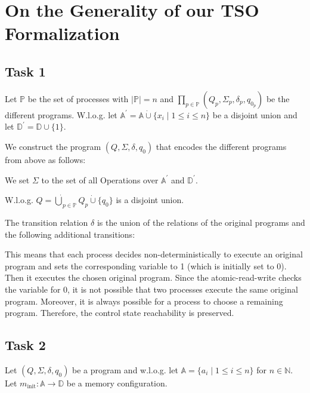 \section{On the Generality of our TSO Formalization}

\subsection{Task 1}
Let $\mathds{P}$ be the set of processes with $|\mathds{P}| = n$ and $\prod_{p \in \mathds{P}} (Q_p,\Sigma_p,\delta_p,q_{0_p})$ be the different programs. W.l.o.g. let $\mathds{A}^\prime = \mathds{A} \dot\cup \{x_i \mid 1 \leq i \leq n\}$ be a disjoint union and let $\mathds{D}^\prime = \mathds{D} \cup \{1\}$.

We construct the program $(Q,\Sigma,\delta,q_0)$ that encodes the different programs from above as follows:

We set $\Sigma$ to the set of all Operations over $\mathds{A}^\prime$ and $\mathds{D}^\prime$.

W.l.o.g. $Q = \dot\bigcup_{p \in \mathds{P}} Q_p \dot\cup \{q_0\}$ is a disjoint union.

The transition relation $\delta$ is the union of the relations of the original programs and the following additional transitions:
\begin{figure}[h]
\end{figure}

This means that each process decides non-deterministically to execute an original program and sets the corresponding variable to 1 (which is initially set to 0). Then it executes the chosen original program. Since the atomic-read-write checks the variable for 0, it is not possible that two processes execute the same original program. Moreover, it is always possible for a process to choose a remaining program. Therefore, the control state reachability is preserved.

\subsection{Task 2}
Let $(Q,\Sigma,\delta,q_0)$ be a program and w.l.o.g. let $\mathds{A} = \{a_i \mid 1 \leq i \leq n\}$ for $n \in \mathds{N}$. Let $m_{\text{init}} : \mathds{A} \rightarrow \mathds{D}$ be a memory configuration.

